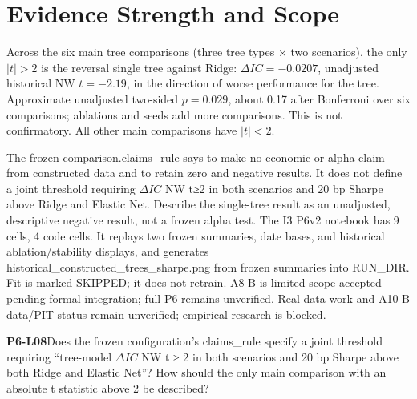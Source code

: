 \clearpage\section{Evidence Strength and Scope}
\begin{strand}
Across the six main tree comparisons (three tree types × two scenarios), the only \(|t|>2\) is the reversal single tree against Ridge: \(\Delta IC=-0.0207\), unadjusted historical NW \(t=-2.19\), in the direction of worse performance for the tree. Approximate unadjusted two-sided \(p=0.029\), about 0.17 after Bonferroni over six comparisons; ablations and seeds add more comparisons. This is not confirmatory. All other main comparisons have \(|t|<2\).
\end{strand}
The frozen comparison.claims\_rule says to make no economic or alpha claim from constructed data and to retain zero and negative results. It does not define a joint threshold requiring \(\Delta IC\) NW t≥2 in both scenarios and 20 bp Sharpe above Ridge and Elastic Net. Describe the single-tree result as an unadjusted, descriptive negative result, not a frozen alpha test.
The I3 P6v2 notebook has 9 cells, 4 code cells. It replays two frozen summaries, date bases, and historical ablation/stability displays, and generates historical\_constructed\_trees\_sharpe.png from frozen summaries into RUN\_DIR. Fit is marked SKIPPED; it does not retrain. A8-B is limited-scope accepted pending formal integration; full P6 remains unverified. Real-data work and A10-B data/PIT status remain unverified; empirical research is blocked.
\begin{yourturn}\textbf{P6-L08}\quad Does the frozen configuration's claims\_rule specify a joint threshold requiring “tree-model \(\Delta IC\) NW t ≥ 2 in both scenarios and 20 bp Sharpe above both Ridge and Elastic Net”? How should the only main comparison with an absolute t statistic above 2 be described?\workspace[5]\end{yourturn}

